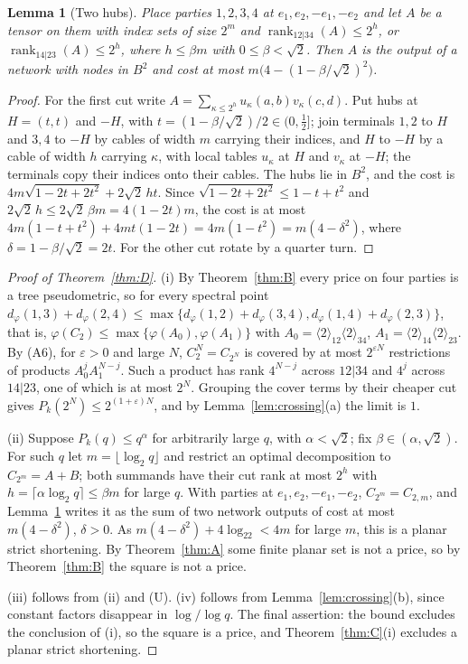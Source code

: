 \documentclass[11pt,a4paper]{article}
\newtheorem{lemma}{Lemma}[section]
\theoremstyle{definition}
\newcommand{\kk}{k}
\newcommand{\rk}{\operatorname{rank}}
\newcommand{\wire}[2]{\langle #1\rangle_{#2}}
\newcommand{\AS}{\textup{A6}}
\begin{document}
\begin{lemma}[Two hubs]\label{lem:hubs}
Place parties $1,2,3,4$ at $e_1,e_2,-e_1,-e_2$ and let $A$ be a tensor on them
with index sets of size $2^m$ and $\rk_{12|34}(A)\le2^h$, or
$\rk_{14|23}(A)\le2^h$, where $h\le\beta m$ with $0\le\beta<\sqrt2$. Then $A$ is
the output of a network with nodes in $B^2$ and cost at most
$m\bigl(4-(1-\beta/\sqrt2)^2\bigr)$.
\end{lemma}

\begin{proof}
For the first cut write $A=\sum_{\kappa\le2^h}u_\kappa(a,b)v_\kappa(c,d)$. Put hubs
at $H=(t,t)$ and $-H$, with $t=(1-\beta/\sqrt2)/2\in(0,\tfrac12]$; join terminals
$1,2$ to $H$ and $3,4$ to $-H$ by cables of width $m$ carrying their indices,
and $H$ to $-H$ by a cable of width $h$ carrying $\kappa$, with local tables
$u_\kappa$ at $H$ and $v_\kappa$ at $-H$; the terminals copy their indices onto
their cables. The hubs lie in $B^2$, and the cost is
$4m\sqrt{1-2t+2t^2}+2\sqrt2\,ht$. Since $\sqrt{1-2t+2t^2}\le1-t+t^2$ and
$2\sqrt2\,h\le2\sqrt2\,\beta m=4(1-2t)m$, the cost is at most
$4m(1-t+t^2)+4mt(1-2t)=4m(1-t^2)=m(4-\delta^2)$, where
$\delta=1-\beta/\sqrt2=2t$. For the other cut rotate by a quarter turn.
\end{proof}

\begin{proof}[Proof of Theorem~\ref{thm:D}]
(i) By Theorem~\ref{thm:B} every price on four parties is a tree pseudometric, so
for every spectral point $d_\varphi(1,3)+d_\varphi(2,4)\le\max\{d_\varphi(1,2)+
d_\varphi(3,4),d_\varphi(1,4)+d_\varphi(2,3)\}$, that is,
$\varphi(C_2)\le\max\{\varphi(A_0),\varphi(A_1)\}$ with
$A_0=\wire{2}{12}\wire{2}{34}$, $A_1=\wire{2}{14}\wire{2}{23}$. By (\AS), for
$\varepsilon>0$ and large $N$, $C_2^N=C_{2^N}$ is covered by at most
$2^{\varepsilon N}$ restrictions of products $A_0^jA_1^{N-j}$. Such a product has
rank $4^{N-j}$ across $12|34$ and $4^j$ across $14|23$, one of which is at most
$2^N$. Grouping the cover terms by their cheaper cut gives
$P_\kk(2^N)\le2^{(1+\varepsilon)N}$, and by Lemma~\ref{lem:crossing}(a) the limit
is $1$.

(ii) Suppose $P_\kk(q)\le q^\alpha$ for arbitrarily large $q$, with
$\alpha<\sqrt2$; fix $\beta\in(\alpha,\sqrt2)$. For such $q$ let
$m=\lfloor\log_2q\rfloor$ and restrict an optimal decomposition to
$C_{2^m}=A+B$; both summands have their cut rank at most $2^h$ with
$h=\lceil\alpha\log_2q\rceil\le\beta m$ for large $q$. With parties at
$e_1,e_2,-e_1,-e_2$, $C_{2^m}=C_{2,m}$, and Lemma~\ref{lem:hubs} writes it as the
sum of two network outputs of cost at most $m(4-\delta^2)$, $\delta>0$. As
$m(4-\delta^2)+4\log_22<4m$ for large $m$, this is a planar strict shortening.
By Theorem~\ref{thm:A} some finite planar set is not a price, so by
Theorem~\ref{thm:B} the square is not a price.

(iii) follows from (ii) and (U). (iv) follows from Lemma~\ref{lem:crossing}(b),
since constant factors disappear in $\log/\log q$. The final assertion: the
bound excludes the conclusion of (i), so the square is a price, and
Theorem~\ref{thm:C}(i) excludes a planar strict shortening.
\end{proof}
\end{document}
